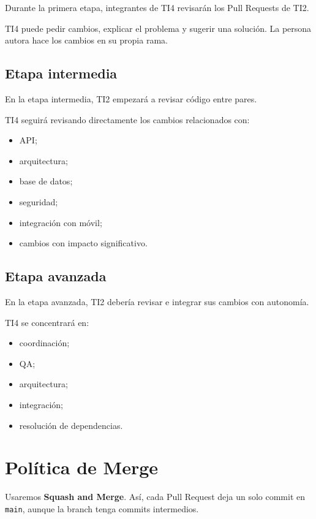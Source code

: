\documentclass[11pt,a4paper]{article}
\begin{document}
Durante la primera etapa, integrantes de TI4 revisarán los Pull Requests de TI2.

TI4 puede pedir cambios, explicar el problema y sugerir una solución. La persona
autora hace los cambios en su propia rama.

\subsection*{Etapa intermedia}

En la etapa intermedia, TI2 empezará a revisar código entre pares.

TI4 seguirá revisando directamente los cambios relacionados con:

\begin{itemize}
  \item API;
  \item arquitectura;
  \item base de datos;
  \item seguridad;
  \item integración con móvil;
  \item cambios con impacto significativo.
\end{itemize}

\subsection*{Etapa avanzada}

En la etapa avanzada, TI2 debería revisar e integrar sus cambios con autonomía.

TI4 se concentrará en:

\begin{itemize}
  \item coordinación;
  \item QA;
  \item arquitectura;
  \item integración;
  \item resolución de dependencias.
\end{itemize}


\section{Política de Merge}

Usaremos \textbf{Squash and Merge}. Así, cada Pull Request deja un solo commit
en \texttt{main}, aunque la branch tenga commits intermedios.
\end{document}
